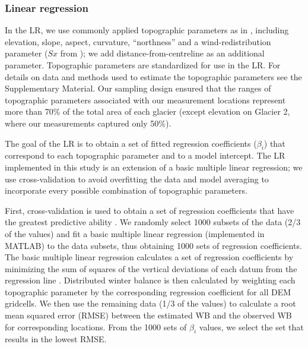 \documentclass[twocolumn, letterpaper]{igs}
\begin{document}
\subsubsection{Linear regression}

In the LR, we use commonly applied topographic parameters as in \cite{McGrath2015}, including elevation, slope, aspect, curvature, ``northness'' and a wind-redistribution parameter ($Sx$ from \cite{Winstral2002}); we add distance-from-centreline as an additional parameter. Topographic parameters are standardized for use in the LR. For details on data and methods used to estimate the topographic parameters see the Supplementary Material. Our sampling design ensured that the ranges of topographic parameters associated with our measurement locations represent more than 70\% of the total area of each glacier (except elevation on Glacier 2, where our measurements captured only 50\%). 

The goal of the LR is to obtain a set of fitted regression coefficients ($\beta_i$) that correspond to each topographic parameter and to a model intercept. The LR implemented in this study is an extension of a basic multiple linear regression; we use cross-validation to avoid overfitting the data and model averaging to incorporate every possible combination of topographic parameters. 

First, cross-validation is used to obtain a set of regression coefficients that have the greatest predictive ability \citep{Kohavi1995}. We randomly select 1000 subsets of the data (2/3 of the values) and fit a basic multiple linear regression (implemented in MATLAB) to the data subsets, thus obtaining 1000 sets of regression coefficients. The basic multiple linear regression calculates a set of regression coefficients by minimizing the sum of squares of the vertical deviations of each datum from the regression line \citep{Davis1986}. Distributed winter balance is then calculated by weighting each topographic parameter by the corresponding regression coefficient for all DEM gridcells. We then use the remaining data (1/3 of the values) to calculate a root mean squared error (RMSE) between the estimated WB and the observed WB for corresponding locations. From the 1000 sets of $\beta_i$ values, we select the set that results in the lowest RMSE. 
\end{document}
